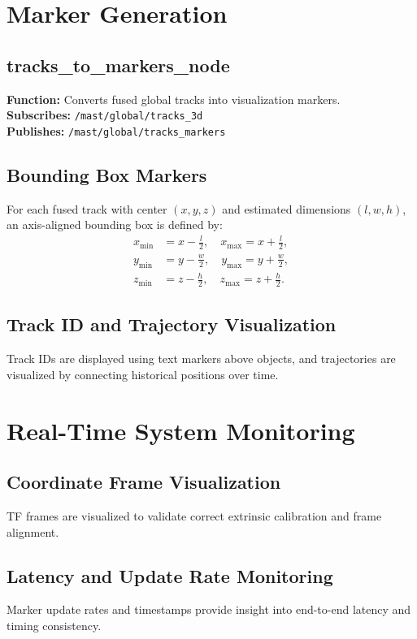 \documentclass[12pt,a4paper]{report}
\begin{document}
\section{Marker Generation}
\subsection{tracks\_to\_markers\_node}
\textbf{Function:} Converts fused global tracks into visualization markers. \\
\textbf{Subscribes:} \texttt{/mast/global/tracks\_3d} \\
\textbf{Publishes:} \texttt{/mast/global/tracks\_markers}

\subsection{Bounding Box Markers}
For each fused track with center $(x,y,z)$ and estimated dimensions $(l,w,h)$, an axis-aligned bounding box is defined by:
\begin{equation}
\begin{aligned}
x_{\min} &= x-\tfrac{l}{2},\quad x_{\max}=x+\tfrac{l}{2}, \\
y_{\min} &= y-\tfrac{w}{2},\quad y_{\max}=y+\tfrac{w}{2}, \\
z_{\min} &= z-\tfrac{h}{2},\quad z_{\max}=z+\tfrac{h}{2}.
\end{aligned}
\end{equation}

\subsection{Track ID and Trajectory Visualization}
Track IDs are displayed using text markers above objects, and trajectories are visualized by connecting historical positions over time.

\section{Real-Time System Monitoring}
\subsection{Coordinate Frame Visualization}
TF frames are visualized to validate correct extrinsic calibration and frame alignment.

\subsection{Latency and Update Rate Monitoring}
Marker update rates and timestamps provide insight into end-to-end latency and timing consistency.
\end{document}
